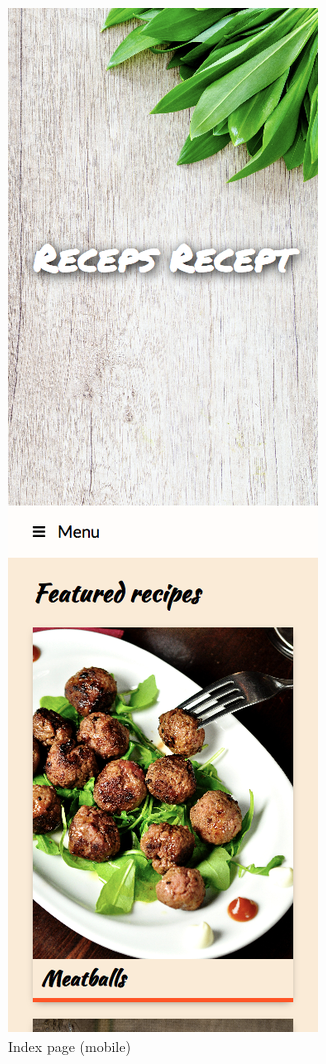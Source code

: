 \documentclass[a4paper]{scrartcl}
\begin{document}
\begin{figure}
	\centering
	\includegraphics[height=\dimexpr\textheight-3\baselineskip-\parskip-.2em-\abovecaptionskip-\belowcaptionskip\relax]{images/screenshot-index-mobile.png}
	\caption{Index page (mobile)}
	\label{fig:index-page-mobile}
\end{figure}
\end{document}
